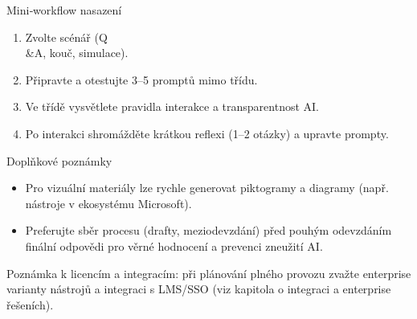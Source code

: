Mini‑workflow nasazení
\begin{enumerate}
  \item Zvolte scénář (Q\\ \&A, kouč, simulace).
  \item Připravte a otestujte 3–5 promptů mimo třídu.
  \item Ve třídě vysvětlete pravidla interakce a transparentnost AI.
  \item Po interakci shromážděte krátkou reflexi (1–2 otázky) a upravte prompty.
\end{enumerate}

Doplňkové poznámky
\begin{itemize}
  \item Pro vizuální materiály lze rychle generovat piktogramy a diagramy (např. nástroje v ekosystému Microsoft).
  \item Preferujte sběr procesu (drafty, meziodevzdání) před pouhým odevzdáním finální odpovědi pro věrné hodnocení a prevenci zneužití AI. \cite{kb_ai_101_tipu_pdf_04e4a115_page_8_1}
\end{itemize}

Poznámka k licencím a integracím: při plánování plného provozu zvažte enterprise varianty nástrojů a integraci s LMS/SSO (viz kapitola o integraci a enterprise řešeních).